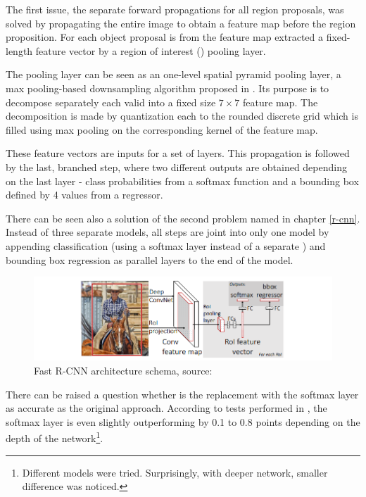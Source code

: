 The first issue, the separate forward propagations for all region proposals, was 
solved by propagating the entire image to obtain a feature map before the region 
proposition. For each object proposal is from the feature map extracted a 
fixed-length feature vector by a region of interest () pooling layer.

The  pooling layer can be seen as an one-level spatial pyramid pooling 
layer, a max pooling-based downsampling algorithm proposed in \cite{spp}. Its 
purpose is to decompose separately each valid  into a fixed size $7 
\times 7$ feature map. The decomposition is made by quantization each  
to the rounded discrete grid which is filled using max pooling on the 
corresponding kernel of the feature map.

These feature vectors are inputs for a set of  layers. This propagation 
is followed by the last, branched step, where two different outputs are obtained 
depending on the last layer - class probabilities from a softmax function and a 
bounding box defined by 4 values from a regressor.

There can be seen also a solution of the second problem named in chapter 
\ref{r-cnn}. Instead of three separate models, all steps are joint into only one 
model by appending classification (using a softmax layer instead of a separate 
) and bounding box regression as parallel layers to the end of the 
model.

\begin{figure}[H]
   \centering
	\includegraphics[width=.9\linewidth]{./pictures/fastrcnn.png}
	\caption[Fast R-CNN architecture]{Fast R-CNN architecture schema, source: 
\cite{fast-rcnn}}
      \label{fig:fast-rcnn}
\end{figure}

There can be raised a question whether is the  replacement with the 
softmax layer as accurate as the original approach. According to tests performed 
in \cite{fast-rcnn}, the softmax layer is even slightly outperforming  
by 0.1 to 0.8  points depending on the depth of the 
network\footnote{Different models were tried. Surprisingly, with deeper network, 
smaller  difference was noticed.}.

